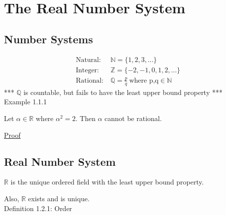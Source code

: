 \newpage
\section[Day 1: The Real Number System]{The Real Number System}





\subsection{Number Systems}

\begin{align*}
	\text{Natural}:\ & \mathbb{N} = \{1, 2, 3, ... \} \\	
	\text{Integer}:\ & \mathbb{Z} = \{-2, -1, 0, 1, 2, ... \} \\
	\text{Rational}:\ & \mathbb{Q} = \frac{p}{q} \ \text{where p,q} \in \mathbb{N}
\end{align*}
*** $\mathbb{Q}$ is countable, but fails to have the least upper bound property *** \\

{ \color{purple} Example 1.1.1 }

	\hspace{1cm}
	Let $ \alpha \in \mathbb{R} $ where $ \alpha^2 = 2 $.
	Then $ \alpha $ cannot be rational.

{ \color{magenta} \underline{Proof} }






\subsection{Real Number System}

	$ \mathbb{R} $ is the unique ordered field with the least upper bound property.
	
	Also, $ \mathbb{R} $ exists and is unique. \\

{ \color{blue} Definition 1.2.1: Order }

